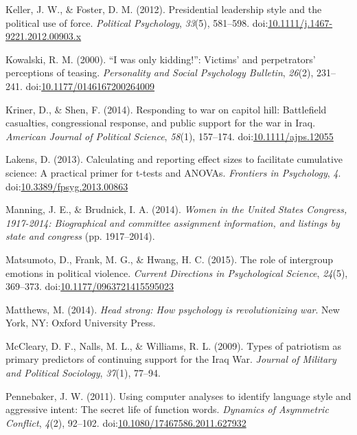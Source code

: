 \documentclass[english,,man,floatsintext]{apa6}
\begin{document}
\leavevmode\hypertarget{ref-Keller2012}{}%
Keller, J. W., \& Foster, D. M. (2012). Presidential leadership style and the political use of force. \emph{Political Psychology}, \emph{33}(5), 581--598. doi:\href{https://doi.org/10.1111/j.1467-9221.2012.00903.x}{10.1111/j.1467-9221.2012.00903.x}

\leavevmode\hypertarget{ref-Kowalski2000}{}%
Kowalski, R. M. (2000). ``I was only kidding!'': Victims' and perpetrators' perceptions of teasing. \emph{Personality and Social Psychology Bulletin}, \emph{26}(2), 231--241. doi:\href{https://doi.org/10.1177/0146167200264009}{10.1177/0146167200264009}

\leavevmode\hypertarget{ref-Kriner2014}{}%
Kriner, D., \& Shen, F. (2014). Responding to war on capitol hill: Battlefield casualties, congressional response, and public support for the war in Iraq. \emph{American Journal of Political Science}, \emph{58}(1), 157--174. doi:\href{https://doi.org/10.1111/ajps.12055}{10.1111/ajps.12055}

\leavevmode\hypertarget{ref-Lakens2013}{}%
Lakens, D. (2013). Calculating and reporting effect sizes to facilitate cumulative science: A practical primer for t-tests and ANOVAs. \emph{Frontiers in Psychology}, \emph{4}. doi:\href{https://doi.org/10.3389/fpsyg.2013.00863}{10.3389/fpsyg.2013.00863}

\leavevmode\hypertarget{ref-Manning2014}{}%
Manning, J. E., \& Brudnick, I. A. (2014). \emph{Women in the United States Congress, 1917-2014: Biographical and committee assignment information, and listings by state and congress} (pp. 1917--2014).

\leavevmode\hypertarget{ref-Matsumoto2015}{}%
Matsumoto, D., Frank, M. G., \& Hwang, H. C. (2015). The role of intergroup emotions in political violence. \emph{Current Directions in Psychological Science}, \emph{24}(5), 369--373. doi:\href{https://doi.org/10.1177/0963721415595023}{10.1177/0963721415595023}

\leavevmode\hypertarget{ref-Matthews2014}{}%
Matthews, M. (2014). \emph{Head strong: How psychology is revolutionizing war}. New York, NY: Oxford University Press.

\leavevmode\hypertarget{ref-McCleary2009}{}%
McCleary, D. F., Nalls, M. L., \& Williams, R. L. (2009). Types of patriotism as primary predictors of continuing support for the Iraq War. \emph{Journal of Military and Political Sociology}, \emph{37}(1), 77--94.

\leavevmode\hypertarget{ref-Pennebaker2011}{}%
Pennebaker, J. W. (2011). Using computer analyses to identify language style and aggressive intent: The secret life of function words. \emph{Dynamics of Asymmetric Conflict}, \emph{4}(2), 92--102. doi:\href{https://doi.org/10.1080/17467586.2011.627932}{10.1080/17467586.2011.627932}
\end{document}
